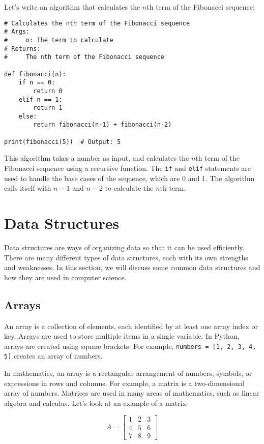Let's write an algorithm that calculates the $n$th term of the Fibonacci sequence:


\begin{lstlisting}
# Calculates the nth term of the Fibonacci sequence
# Args:
#     n: The term to calculate
# Returns:
#     The nth term of the Fibonacci sequence

def fibonacci(n):
    if n == 0:
        return 0
    elif n == 1:
        return 1
    else:
        return fibonacci(n-1) + fibonacci(n-2)

print(fibonacci(5))  # Output: 5
\end{lstlisting}

This algorithm takes a number as input, and calculates the $n$th term of the Fibonacci sequence using a recursive function. The \texttt{if} and \texttt{elif} statements are used to handle the base cases of the sequence, which are 0 and 1. The algorithm calls itself with $n-1$ and $n-2$ to calculate the $n$th term.

\section{Data Structures}

Data structures are ways of organizing data so that it can be used efficiently. There are many different types of data structures, each with its own strengths and weaknesses. In this section, we will discuss some common data structures and how they are used in computer science.

\subsection{Arrays}

An array is a collection of elements, each identified by at least one array index or key. Arrays are used to store multiple items in a single variable. In Python, arrays are created using square brackets. For example, \texttt{numbers = [1, 2, 3, 4, 5]} creates an array of numbers.

In mathematics, an array is a rectangular arrangement of numbers, symbols, or expressions in rows and columns. For example, a matrix is a two-dimensional array of numbers. Matrices are used in many areas of mathematics, such as linear algebra and calculus. Let's look at an example of a matrix:

\begin{equation}
    A = \begin{bmatrix}
        1 & 2 & 3 \\
        4 & 5 & 6 \\
        7 & 8 & 9
    \end{bmatrix}
\end{equation}

